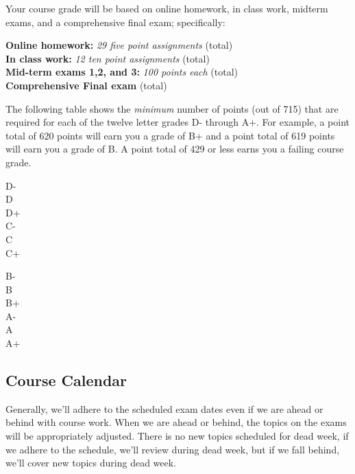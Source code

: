 \documentclass[12pt]{article}
\newcounter{ex}\setcounter{ex}{0}
\newenvironment{mypar}[2]
  {\begin{list}{}%
    {\setlength\leftmargin{#1}
    \setlength\rightmargin{#2}}
    \item[]}
  {\end{list}}
\begin{document}
Your course grade will be based on online homework, in class work, midterm exams, and a comprehensive 
final exam; specifically:
\begin{mypar}{0.25in}{0.25in}
    \textbf{Online homework:} \emph{29 five point assignments}  (total)\\
    \textbf{In class work:}  \emph{12 ten point assignments}   (total) \\
    \textbf{Mid-term exams 1,2, and 3:} \emph{100 points each}  (total)\\
      \textbf{Comprehensive Final exam}  (total)\\
\end{mypar}
\noindent The following table shows the \emph{minimum} number of points (out of 715) that
are required for each of the twelve letter grades D- through A+. For
example, a point total of 620 points will earn you a grade of B+ and 
a point total of 619 points will earn you a grade of B. A point
total of 429 or less earns you a failing course grade.
\begin{mypar}{0.25in}{0.25in}
    \begin{minipage}{2.5in}
        D-    \\
        D  \\
        D+  \\
        C-  \\
        C  \\
        C+  
    \end{minipage}
    \phantom{xxx}
    \begin{minipage}{2.5in}
        B-  \\
        B  \\
        B+  \\
        A-   \\
        A  \\
        A+  
    \end{minipage}
\end{mypar} 

\subsection*{Course Calendar}

Generally, we'll adhere to the scheduled exam dates even if we are ahead or behind with course work.  When we are ahead or behind, the
topics on the exams will be appropriately adjusted.  There is no new topics scheduled for dead week, if we adhere to the schedule, we'll review during dead week, but
if we fall behind, we'll cover new topics during dead week.
\end{document}
